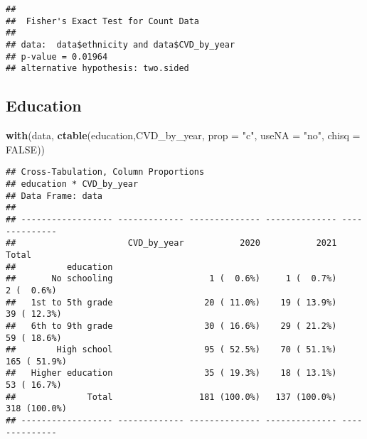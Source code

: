 \documentclass[
]{article}
\newenvironment{Shaded}{\begin{snugshade}}{\end{snugshade}}
\newcommand{\AttributeTok}[1]{\textcolor[rgb]{0.13,0.29,0.53}{#1}}
\newcommand{\ConstantTok}[1]{\textcolor[rgb]{0.56,0.35,0.01}{#1}}
\newcommand{\FunctionTok}[1]{\textcolor[rgb]{0.13,0.29,0.53}{\textbf{#1}}}
\newcommand{\NormalTok}[1]{#1}
\newcommand{\SpecialCharTok}[1]{\textcolor[rgb]{0.81,0.36,0.00}{\textbf{#1}}}
\newcommand{\StringTok}[1]{\textcolor[rgb]{0.31,0.60,0.02}{#1}}
\begin{document}
\begin{Shaded}
\end{Shaded}

\begin{verbatim}
## 
##  Fisher's Exact Test for Count Data
## 
## data:  data$ethnicity and data$CVD_by_year
## p-value = 0.01964
## alternative hypothesis: two.sided
\end{verbatim}

\hypertarget{education}{%
\subsection{Education}\label{education}}

\begin{Shaded}
\begin{Highlighting}[]
\FunctionTok{with}\NormalTok{(data, }\FunctionTok{ctable}\NormalTok{(education,CVD\_by\_year, }\AttributeTok{prop =} \StringTok{"c"}\NormalTok{, }\AttributeTok{useNA =} \StringTok{"no"}\NormalTok{, }\AttributeTok{chisq =} \ConstantTok{FALSE}\NormalTok{))}
\end{Highlighting}
\end{Shaded}

\begin{verbatim}
## Cross-Tabulation, Column Proportions  
## education * CVD_by_year  
## Data Frame: data  
## 
## ------------------ ------------- -------------- -------------- --------------
##                      CVD_by_year           2020           2021          Total
##          education                                                           
##       No schooling                   1 (  0.6%)     1 (  0.7%)     2 (  0.6%)
##   1st to 5th grade                  20 ( 11.0%)    19 ( 13.9%)    39 ( 12.3%)
##   6th to 9th grade                  30 ( 16.6%)    29 ( 21.2%)    59 ( 18.6%)
##        High school                  95 ( 52.5%)    70 ( 51.1%)   165 ( 51.9%)
##   Higher education                  35 ( 19.3%)    18 ( 13.1%)    53 ( 16.7%)
##              Total                 181 (100.0%)   137 (100.0%)   318 (100.0%)
## ------------------ ------------- -------------- -------------- --------------
\end{verbatim}

\begin{Shaded}
\end{Shaded}
\end{document}
